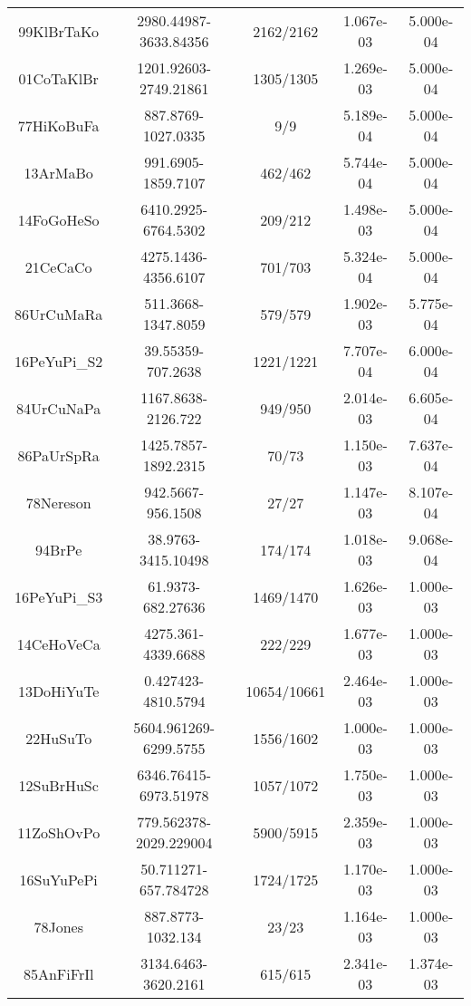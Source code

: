 \begin{longtable}{c c c c c}
99KlBrTaKo \cite{99KlBrTaKo} & 2980.44987-3633.84356 & 2162/2162 & 1.067e-03 & 5.000e-04 \\
01CoTaKlBr \cite{01CoTaKlBr} & 1201.92603-2749.21861 & 1305/1305 & 1.269e-03 & 5.000e-04 \\
77HiKoBuFa \cite{77HiKoBuFa} & 887.8769-1027.0335 & 9/9 & 5.189e-04 & 5.000e-04 \\
13ArMaBo \cite{13ArMaBo} & 991.6905-1859.7107 & 462/462 & 5.744e-04 & 5.000e-04 \\
14FoGoHeSo \cite{14FoGoHeSo} & 6410.2925-6764.5302 & 209/212 & 1.498e-03 & 5.000e-04 \\
21CeCaCo \cite{21CeCaCo} & 4275.1436-4356.6107 & 701/703 & 5.324e-04 & 5.000e-04 \\
86UrCuMaRa \cite{86UrCuMaRa} & 511.3668-1347.8059 & 579/579 & 1.902e-03 & 5.775e-04 \\
16PeYuPi_S2 \cite{16PeYuPi_S2} & 39.55359-707.2638 & 1221/1221 & 7.707e-04 & 6.000e-04 \\
84UrCuNaPa \cite{84UrCuNaPa} & 1167.8638-2126.722 & 949/950 & 2.014e-03 & 6.605e-04 \\
86PaUrSpRa \cite{86PaUrSpRa} & 1425.7857-1892.2315 & 70/73 & 1.150e-03 & 7.637e-04 \\
78Nereson \cite{78Nereson} & 942.5667-956.1508 & 27/27 & 1.147e-03 & 8.107e-04 \\
94BrPe \cite{94BrPe} & 38.9763-3415.10498 & 174/174 & 1.018e-03 & 9.068e-04 \\
16PeYuPi_S3 \cite{16PeYuPi_S3} & 61.9373-682.27636 & 1469/1470 & 1.626e-03 & 1.000e-03 \\
14CeHoVeCa \cite{14CeHoVeCa} & 4275.361-4339.6688 & 222/229 & 1.677e-03 & 1.000e-03 \\
13DoHiYuTe \cite{13DoHiYuTe} & 0.427423-4810.5794 & 10654/10661 & 2.464e-03 & 1.000e-03 \\
22HuSuTo \cite{22HuSuTo} & 5604.961269-6299.5755 & 1556/1602 & 1.000e-03 & 1.000e-03 \\
12SuBrHuSc \cite{12SuBrHuSc} & 6346.76415-6973.51978 & 1057/1072 & 1.750e-03 & 1.000e-03 \\
11ZoShOvPo \cite{11ZoShOvPo} & 779.562378-2029.229004 & 5900/5915 & 2.359e-03 & 1.000e-03 \\
16SuYuPePi \cite{16SuYuPePi} & 50.711271-657.784728 & 1724/1725 & 1.170e-03 & 1.000e-03 \\
78Jones \cite{78Jones} & 887.8773-1032.134 & 23/23 & 1.164e-03 & 1.000e-03 \\
85AnFiFrIl \cite{85AnFiFrIl} & 3134.6463-3620.2161 & 615/615 & 2.341e-03 & 1.374e-03 \\

\end{longtable}

